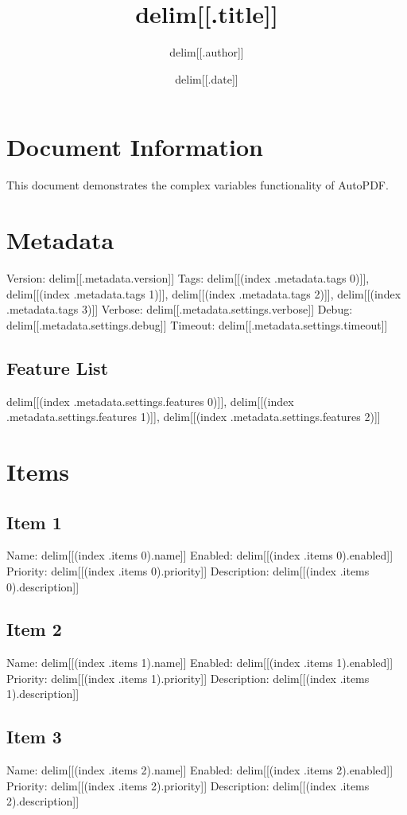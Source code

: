 \documentclass{article}
\title{delim[[.title]]}
\author{delim[[.author]]}
\date{delim[[.date]]}
\begin{document}
\maketitle

\section{Document Information}
This document demonstrates the complex variables functionality of AutoPDF.

\section{Metadata}
Version: delim[[.metadata.version]]
Tags: delim[[(index .metadata.tags 0)]], delim[[(index .metadata.tags 1)]], delim[[(index .metadata.tags 2)]], delim[[(index .metadata.tags 3)]]
Verbose: delim[[.metadata.settings.verbose]]
Debug: delim[[.metadata.settings.debug]]
Timeout: delim[[.metadata.settings.timeout]]

\subsection{Feature List}
delim[[(index .metadata.settings.features 0)]], delim[[(index .metadata.settings.features 1)]], delim[[(index .metadata.settings.features 2)]]

\section{Items}
\subsection{Item 1}
Name: delim[[(index .items 0).name]]
Enabled: delim[[(index .items 0).enabled]]
Priority: delim[[(index .items 0).priority]]
Description: delim[[(index .items 0).description]]

\subsection{Item 2}
Name: delim[[(index .items 1).name]]
Enabled: delim[[(index .items 1).enabled]]
Priority: delim[[(index .items 1).priority]]
Description: delim[[(index .items 1).description]]

\subsection{Item 3}
Name: delim[[(index .items 2).name]]
Enabled: delim[[(index .items 2).enabled]]
Priority: delim[[(index .items 2).priority]]
Description: delim[[(index .items 2).description]]
\end{document}
